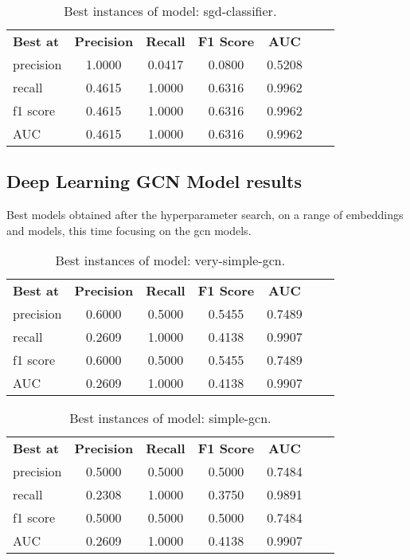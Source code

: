 \begin{table}[H]
    \centering
    \caption{Best instances of model: sgd-classifier.}
    \begin{tabular}{lcccccc}
      \textbf{Best at}  & \textbf{Precision} & \textbf{Recall} & \textbf{F1 Score} & \textbf{AUC} \\
        precision & 1.0000 & 0.0417 & 0.0800 & 0.5208 \\
        recall & 0.4615 & 1.0000 & 0.6316 & 0.9962 \\
        f1 score & 0.4615 & 1.0000 & 0.6316 & 0.9962 \\
        AUC & 0.4615 & 1.0000 & 0.6316 & 0.9962 \\
    \end{tabular}
\end{table}

\subsection{Deep Learning GCN Model results}
Best models obtained after the hyperparameter search, on a range of embeddings and models, this time focusing on the \acrshort{gcn} models.

\begin{table}[H]
    \centering
    \caption{Best instances of model: very-simple-gcn.}
    \begin{tabular}{lcccccc}
      \textbf{Best at}  & \textbf{Precision} & \textbf{Recall} & \textbf{F1 Score} & \textbf{AUC} \\
        precision & 0.6000 & 0.5000 & 0.5455 & 0.7489 \\
        recall & 0.2609 & 1.0000 & 0.4138 & 0.9907 \\
        f1 score & 0.6000 & 0.5000 & 0.5455 & 0.7489 \\
        AUC & 0.2609 & 1.0000 & 0.4138 & 0.9907 \\
    \end{tabular}
\end{table}

\begin{table}[H]
    \centering
    \caption{Best instances of model: simple-gcn.}
    \begin{tabular}{lcccccc}
      \textbf{Best at}  & \textbf{Precision} & \textbf{Recall} & \textbf{F1 Score} & \textbf{AUC} \\
        precision & 0.5000 & 0.5000 & 0.5000 & 0.7484 \\
        recall & 0.2308 & 1.0000 & 0.3750 & 0.9891 \\
        f1 score & 0.5000 & 0.5000 & 0.5000 & 0.7484 \\
        AUC & 0.2609 & 1.0000 & 0.4138 & 0.9907 \\
    \end{tabular}
\end{table}

